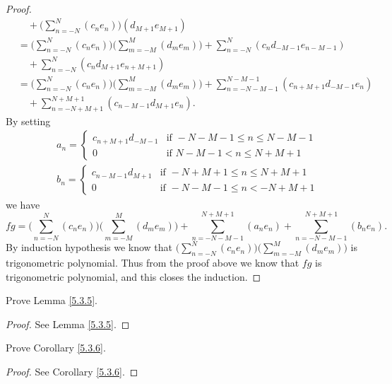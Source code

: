 \begin{proof}
\begin{align*}
            & \quad + \bigg(\sum_{n = -N}^N (c_n e_n)\bigg) (d_{M + 1} e_{M + 1})                                                                              \\
            & = \bigg(\sum_{n = -N}^N (c_n e_n)\bigg) \bigg(\sum_{m = -M}^M (d_m e_m)\bigg) + \sum_{n = -N}^N (c_n d_{-M - 1} e_{n - M - 1})                   \\
            & \quad + \sum_{n = -N}^N (c_n d_{M + 1} e_{n + M + 1})                                                                                            \\
            & = \bigg(\sum_{n = -N}^N (c_n e_n)\bigg) \bigg(\sum_{m = -M}^M (d_m e_m)\bigg) + \sum_{n = -N - M - 1}^{N - M - 1} (c_{n + M + 1} d_{-M - 1} e_n) \\
            & \quad + \sum_{n = -N + M + 1}^{N + M + 1} (c_{n - M - 1} d_{M + 1} e_n).
    \end{align*}
    By setting
    \begin{align*}
         & a_n = \begin{cases}
                     c_{n + M + 1} d_{-M - 1} & \text{if } -N - M - 1 \leq n \leq N - M - 1 \\
                     0                        & \text{if } N - M - 1 < n \leq N + M + 1
                 \end{cases} \\
         & b_n = \begin{cases}
                     c_{n - M - 1} d_{M + 1} & \text{if } -N + M + 1 \leq n \leq N + M + 1 \\
                     0                       & \text{if } -N - M - 1 \leq n < -N + M + 1
                 \end{cases}
    \end{align*}
    we have
    \[
        fg = \bigg(\sum_{n = -N}^N (c_n e_n)\bigg) \bigg(\sum_{m = -M}^M (d_m e_m)\bigg) + \sum_{n = -N - M - 1}^{N + M + 1} (a_n e_n) + \sum_{n = -N - M - 1}^{N + M + 1} (b_n e_n).
    \]
    By induction hypothesis we know that \(\bigg(\sum_{n = -N}^N (c_n e_n)\bigg) \bigg(\sum_{m = -M}^M (d_m e_m)\bigg)\) is trigonometric polynomial.
    Thus from the proof above we know that \(fg\) is trigonometric polynomial, and this closes the induction.
\end{proof}

\begin{exercise}\label{ex 5.3.2}
    Prove Lemma \ref{5.3.5}.
\end{exercise}

\begin{proof}
    See Lemma \ref{5.3.5}.
\end{proof}

\begin{exercise}\label{ex 5.3.3}
    Prove Corollary \ref{5.3.6}.
\end{exercise}

\begin{proof}
    See Corollary \ref{5.3.6}.
\end{proof}
